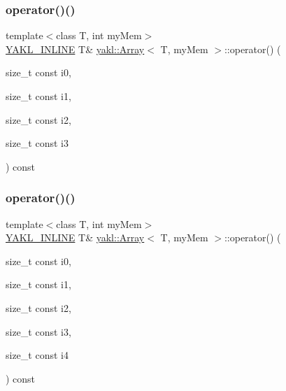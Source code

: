 \subsubsection{\texorpdfstring{operator()()}{operator()()}\hspace{0.1cm}{\footnotesize\ttfamily [4/8]}}
{\footnotesize\ttfamily template$<$class T, int my\+Mem$>$ \\
\hyperlink{YAKL_8h_aa0dd629ffce6d564b19e9313fb91a5ad}{Y\+A\+K\+L\+\_\+\+I\+N\+L\+I\+NE} T\& \hyperlink{classyakl_1_1Array}{yakl\+::\+Array}$<$ T, my\+Mem $>$\+::operator() (\begin{DoxyParamCaption}\item[{size\+\_\+t const}]{i0,  }\item[{size\+\_\+t const}]{i1,  }\item[{size\+\_\+t const}]{i2,  }\item[{size\+\_\+t const}]{i3 }\end{DoxyParamCaption}) const\hspace{0.3cm}{\ttfamily [inline]}}

\mbox{\label{classyakl_1_1Array_a1910b47b3a87326a51a8859969920a21}} 
\subsubsection{\texorpdfstring{operator()()}{operator()()}\hspace{0.1cm}{\footnotesize\ttfamily [5/8]}}
{\footnotesize\ttfamily template$<$class T, int my\+Mem$>$ \\
\hyperlink{YAKL_8h_aa0dd629ffce6d564b19e9313fb91a5ad}{Y\+A\+K\+L\+\_\+\+I\+N\+L\+I\+NE} T\& \hyperlink{classyakl_1_1Array}{yakl\+::\+Array}$<$ T, my\+Mem $>$\+::operator() (\begin{DoxyParamCaption}\item[{size\+\_\+t const}]{i0,  }\item[{size\+\_\+t const}]{i1,  }\item[{size\+\_\+t const}]{i2,  }\item[{size\+\_\+t const}]{i3,  }\item[{size\+\_\+t const}]{i4 }\end{DoxyParamCaption}) const\hspace{0.3cm}{\ttfamily [inline]}}

\mbox{\label{classyakl_1_1Array_a05724663c7b87249c1b8c973c41e4b6c}} 

